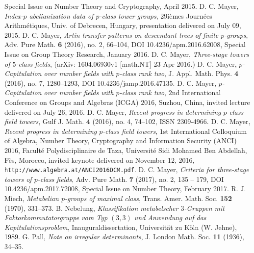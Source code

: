 \documentclass{amsart}
\theoremstyle{definition}
\numberwithin{equation}{section}
\begin{document}
\begin{thebibliography}{XX}
Special Issue on Number Theory and Cryptography,
April 2015.
%
D. C. Mayer,
\textit{Index-\(p\) abelianization data of \(p\)-class tower groups},
29i\`emes Journ\'ees Arithm\'etiques,
Univ. of Debrecen,
Hungary,
presentation delivered on July 09, 2015.
%
D. C. Mayer,
\textit{Artin transfer patterns on descendant trees of finite \(p\)-groups},
Adv. Pure Math.
\textbf{6}
(2016),
no. 2,
66--104,
DOI 10.4236/apm.2016.62008,
Special Issue on Group Theory Research,
January 2016.
%
D. C. Mayer,
\textit{Three-stage towers of \(5\)-class fields},
(arXiv: 1604.06930v1 [math.NT] 23 Apr 2016.)
%
D. C. Mayer,
\textit{\(p\)-Capitulation over number fields with \(p\)-class rank two},
J. Appl. Math. Phys.
\textbf{4}
(2016),
no. 7,
1280--1293,
DOI 10.4236/jamp.2016.47135.
%
D. C. Mayer,
\textit{\(p\)-Capitulation over number fields with \(p\)-class rank two},
\(2\)nd International Conference on Groups and Algebras (ICGA) \(2016\),
Suzhou, China,
invited lecture delivered on July 26, 2016.
%
D. C. Mayer,
\textit{Recent progress in determining \(p\)-class field towers},
Gulf J. Math.
\textbf{4}
(2016),
no. 4,
74--102,
ISSN 2309-4966.
%
D. C. Mayer,
\textit{Recent progress in determining \(p\)-class field towers},
\(1\)st International Colloquium of Algebra, Number Theory, Cryptography and Information Security (ANCI) \(2016\),
Facult\'e Polydisciplinaire de Taza,
Universit\'e Sidi Mohamed Ben Abdellah,
F\`es, Morocco,
invited keynote delivered on November 12, 2016, \\
\verb+http://www.algebra.at/ANCI2016DCM.pdf+.
%
D. C. Mayer,
\textit{Criteria for three-stage towers of \(p\)-class fields},
Adv. Pure Math.
\textbf{7}
(2017),
no. 2,
135 -- 179,
DOI 10.4236/apm.2017.72008, 
Special Issue on Number Theory,
February 2017.
%
R. J. Miech,
\textit{Metabelian \(p\)-groups of maximal class},
Trans. Amer. Math. Soc.
\textbf{152}
(1970),
331--373.
%
B. Nebelung,
\textit{Klassifikation metabelscher \(3\)-Gruppen
mit Faktorkommutatorgruppe vom Typ \((3,3)\)
und Anwendung auf das Kapitulationsproblem},
Inauguraldissertation,
Universit\"at zu K\"oln (W. Jehne),
1989.
%
G. Pall,
\textit{Note on irregular determinants},
J. London Math. Soc.
\textbf{11}
(1936),
34--35.
%
\end{thebibliography}

\end{document}
